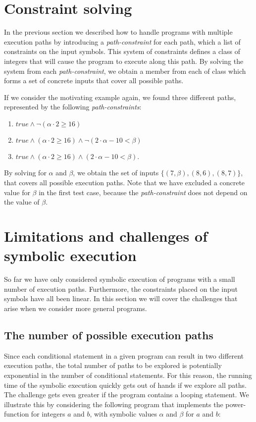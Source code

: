 		
\section{Constraint solving}
	
	In the previous section we described how to handle programs with multiple execution paths by introducing a \emph{path-constraint} for each path, which a list of constraints on the input symbols. This system of constraints defines a class of integers that will cause the program to execute along this path. By solving the system from each \emph{path-constraint}, we obtain a member from each of class which forms a set of concrete inputs that cover all possible paths.    
	
	If we consider the motivating example again, we found three different paths, represented by the following \emph{path-constraints}:
	\begin{enumerate}
		\item $true \land \neg (\alpha \cdot 2 \geq 16)$
		\item $true \land (\alpha \cdot 2 \geq 16) \land \neg (2\cdot \alpha - 10 < \beta)$
		\item $true \land (\alpha \cdot 2 \geq 16) \land (2\cdot \alpha - 10 < \beta)$.
	\end{enumerate}
	
	By solving for $\alpha$ and $\beta$, we obtain the set of inputs $\{(7, \beta), (8,6), (8, 7)\}$, that covers all possible execution paths. Note that we have excluded a concrete value for $\beta$ in the first test case, because the \emph{path-constraint} does not depend on the value of $\beta$. 
	 
\section{Limitations and challenges of symbolic execution}
	So far we have only considered symbolic execution of programs with a small number of execution paths. Furthermore, the constraints placed on the input symbols have all been linear.
	In this section we will cover the challenges that arise when we consider more general programs.
	
	\subsection{The number of possible execution paths} 
		Since each conditional statement in a given program can result in two different execution paths, the total number of paths to be explored is potentially exponential in the number of conditional statements. 
		For this reason, the running time of the symbolic execution quickly gets out of hands if we explore all paths. 
		 The challenge gets even greater if the program contains a looping statement. We illustrate this by considering the following program that implements the power-function for integers $a$ and $b$, with symbolic values $\alpha$ and $\beta$ for $a$ and $b$:
		\pow{}
		
